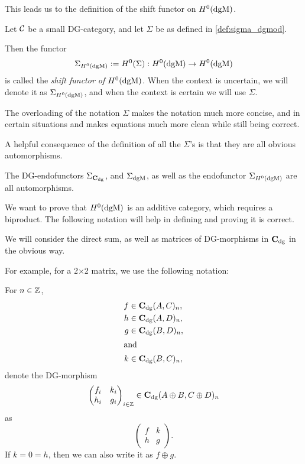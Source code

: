 This leads us to the definition of the shift functor on \( H^0(\operatorname{dgM}) \).

\begin{definition}
    \label{def:sigma_h_0_dgmod}
    Let \( {\mathcal{C}} \) be a small DG-category, and let \( \Sigma \) be as defined in \autoref{def:sigma_dgmod}.

    Then the functor
    \[
        \Sigma_{H^0(\operatorname{dgM})} := H^0(\Sigma): H^0(\operatorname{dgM}) \to H^0(\operatorname{dgM})
    \]
    is called the \emph{shift functor of \( H^0(\operatorname{dgM}) \)}. When the context is uncertain, we will denote it as \( \Sigma_{H^0(\operatorname{dgM})} \), and when the context is certain we will use \( \Sigma \).
\end{definition}

The overloading of the notation \( \Sigma \) makes the notation much more concise, and in certain situations and makes equations much more clean while still being correct.

A helpful consequence of the definition of all the \( \Sigma \)'s is that they are all obvious automorphisms.
\begin{remark}
    \label{rem:dgm_sigma_automorphism}
    The DG-endofunctors \( \Sigma_{\operatorname{\mathbf{C}}_{\operatorname{dg}}} \), and \( \Sigma_{\operatorname{dgM}} \), as well as the endofunctor \( \Sigma_{H^0(\operatorname{dgM})} \) are all automorphisms.
\end{remark}

We want to prove that \( H^0(\operatorname{dgM}) \) is an additive category, which requires a biproduct. The following notation will help in defining and proving it is correct.

\begin{notation}
    \label{not:c_dg_matrix_direct_sum}
    We will consider the direct sum, as well as matrices of DG-morphisms in \( \operatorname{\mathbf{C}}_{\operatorname{dg}} \) in the obvious way.

    For example, for a 2×2 matrix, we use the following notation:

    For \( n \in {\mathbb{Z}} \),
    \begin{align*}
        f &\in \operatorname{\mathbf{C}}_{\operatorname{dg}}(A, C)_n, \\
        h &\in \operatorname{\mathbf{C}}_{\operatorname{dg}}(A, D)_n, \\
        g &\in \operatorname{\mathbf{C}}_{\operatorname{dg}}(B, D)_n, \\
        \intertext{and}
        k &\in \operatorname{\mathbf{C}}_{\operatorname{dg}}(B, C)_n,
    \end{align*}
    denote the DG-morphism
    \[
        \begin{pmatrix}
            f_i & k_i \\
            h_i & g_i
        \end{pmatrix}_{i \in {\mathbb{Z}}}
        \in
        \operatorname{\mathbf{C}}_{\operatorname{dg}}(A \oplus B, C \oplus D)_n
    \]
    as
    \[
        \begin{pmatrix}
            f & k \\
            h & g
        \end{pmatrix}.
    \]
    If \( k = 0 = h \), then we can also write it as \( f \oplus g \).
\end{notation}

